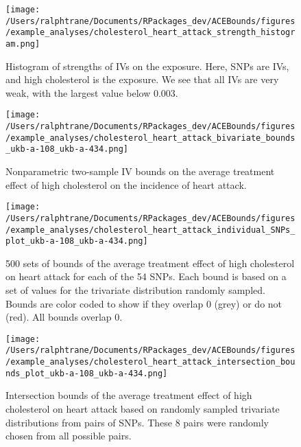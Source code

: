 \documentclass[
]{article}
\theoremstyle{plain}
\begin{document}
\begin{figure}[H]
 \center
 \texttt{[image: /Users/ralphtrane/Documents/RPackages\_dev/ACEBounds/figures/example\_analyses/cholesterol\_heart\_attack\_strength\_histogram.png]}
 \caption{Histogram of strengths of IVs on the exposure. Here, SNPs are IVs, and high cholesterol is the exposure. We see that all IVs are very weak, with the largest value below 0.003.}
 \label{fig:cholesterol_heart_attack_strength_histogram}
\end{figure}

\begin{figure}[H]
  \texttt{[image: /Users/ralphtrane/Documents/RPackages\_dev/ACEBounds/figures/example\_analyses/cholesterol\_heart\_attack\_bivariate\_bounds\_ukb-a-108\_ukb-a-434.png]}
  \caption{Nonparametric two-sample IV bounds on the average treatment effect of high cholesterol on the incidence of heart attack.}
  \label{fig:cholesterol_on_heart_attack_ind_bounds}
\end{figure}

\clearpage

\begin{sidewaysfigure}
  \center
  \texttt{[image: /Users/ralphtrane/Documents/RPackages\_dev/ACEBounds/figures/example\_analyses/cholesterol\_heart\_attack\_individual\_SNPs\_plot\_ukb-a-108\_ukb-a-434.png]}
    \caption{500 sets of bounds of the average treatment effect of high cholesterol on heart attack for each of the 54 SNPs. Each bound is based on a set of values for the trivariate distribution randomly sampled. Bounds are color coded to show if they overlap 0 (grey) or do not (red). All bounds overlap 0.}
    \label{fig:cholesterol_heart_attack_tri_bounds_all}
\end{sidewaysfigure}

\clearpage

\begin{figure}[H]
  \center
  \texttt{[image: /Users/ralphtrane/Documents/RPackages\_dev/ACEBounds/figures/example\_analyses/cholesterol\_heart\_attack\_intersection\_bounds\_plot\_ukb-a-108\_ukb-a-434.png]}
  \caption{Intersection bounds of the average treatment effect of high cholesterol on heart attack based on randomly sampled trivariate distributions from pairs of SNPs. These 8 pairs were randomly chosen from all possible pairs.}
  \label{fig:cholesterol_on_heart_attack_intersections}
\end{figure}

\newpage

\printbibliography
\end{document}
